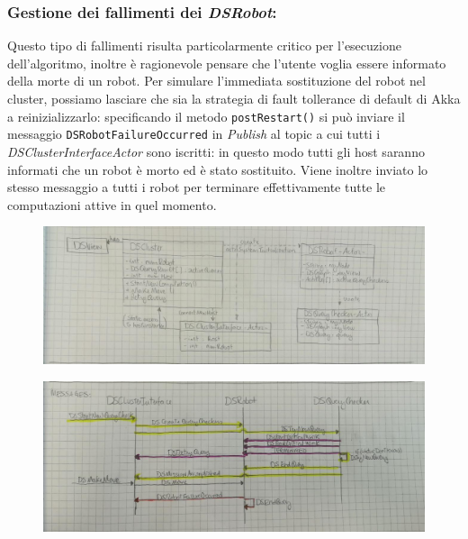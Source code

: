 \subsubsection*{Gestione dei fallimenti dei \emph{DSRobot}:}
Questo tipo di fallimenti risulta particolarmente critico per
l'esecuzione dell'algoritmo, inoltre è ragionevole pensare che
l'utente voglia essere informato della morte di un robot.
Per simulare l'immediata sostituzione del robot nel cluster,
possiamo lasciare che sia la strategia di fault tollerance di default
di Akka a reinizializzarlo: specificando il metodo \texttt{postRestart()}
si può inviare il messaggio \texttt{DSRobotFailureOccurred}
in \emph{Publish} al topic a cui tutti i
\emph{DSClusterInterfaceActor} sono iscritti: in questo modo tutti gli
host saranno informati che un robot è morto ed è stato sostituito.
Viene inoltre inviato lo stesso messaggio a tutti i
robot per terminare effettivamente tutte le computazioni attive
in quel momento.
%
\begin{figure}[ht!]
\centering
\includegraphics[width=\textwidth]{UML-classes.jpg}
\caption{\label{fig:UML-classes}
}
\end{figure}
\begin{figure}[ht!]
\centering
\includegraphics[width=\textwidth]{UML-messages.jpg}
\caption{\label{fig:UML-messages}
}
\end{figure}
%
